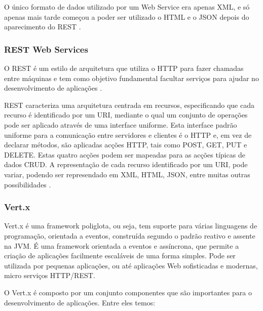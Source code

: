 O único formato de dados utilizado por um Web Service era apenas \gls{XML}, e só apenas mais tarde começou a poder ser utilizado o \gls{HTML} e o \gls{JSON} depois do aparecimento do \gls{REST} \cite{wsjakob}.

\subsubsection{ REST Web Services}

O \gls{REST} é um estilo de arquitetura que utiliza o \gls{HTTP} para fazer chamadas entre máquinas e tem como objetivo fundamental facultar serviços para ajudar no desenvolvimento de aplicações \cite{whatisrest}.

\gls{REST} caracteriza uma arquitetura centrada em recursos, especificando que cada recurso é identificado por um \gls{URI}, mediante o qual um conjunto de operações pode ser aplicado através de uma interface uniforme. Esta interface padrão uniforme para a comunicação entre servidores e clientes é o \gls{HTTP} e, em vez de declarar métodos, são aplicadas acções \gls{HTTP}, tais como POST, GET, PUT e DELETE. Estas quatro acções podem ser mapeadas para as acções típicas de dados \gls{CRUD}. A representação de cada recurso identificado por um URI, pode variar, podendo ser represendado em \gls{XML}, \gls{HTML}, \gls{JSON}, entre muitas outras possibilidades \cite{restwebservices}.

\subsubsection{Vert.x}

Vert.x é uma framework poliglota, ou seja, tem suporte para várias linguagens de programação, orientada a eventos, construída segundo o padrão reativo e assente na \gls{JVM}. É uma framework orientada a eventos e assíncrona, que permite a criação de aplicações facilmente escaláveis de uma forma simples. Pode ser utilizada por pequenas aplicações, ou até aplicações Web sofisticadas e modernas, micro serviços \gls{HTTP}/\gls{REST}.\cite{vertx-io}

O Vert.x é composto por um conjunto componentes que são importantes para o desenvolvimento de aplicações. Entre eles temos: 

